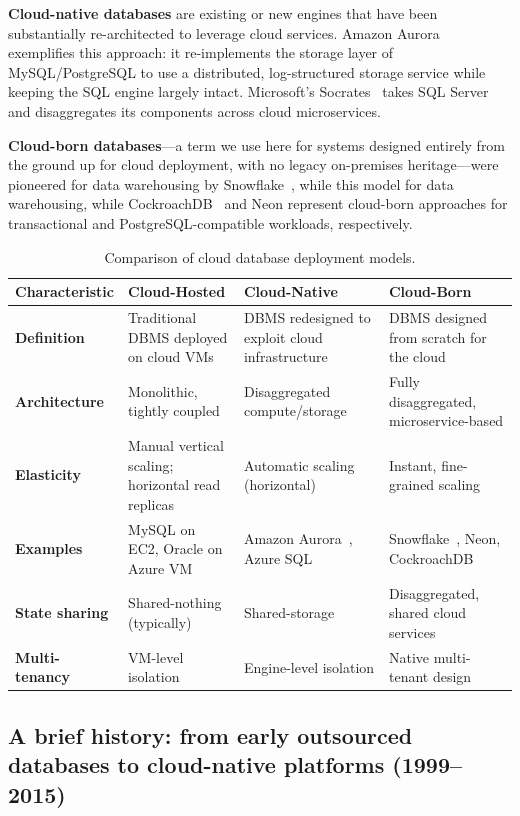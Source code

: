 \documentclass[a4paper,fleqn]{cas-sc}
\begin{document}
\textbf{Cloud-native databases} are existing or new engines that have been substantially re-architected to leverage cloud services. Amazon Aurora~\cite{Verbitski2017} exemplifies this approach: it re-implements the storage layer of MySQL/PostgreSQL to use a distributed, log-structured storage service while keeping the SQL engine largely intact. Microsoft's Socrates~\cite{Antonopoulos2019} takes SQL Server and disaggregates its components across cloud microservices.

\textbf{Cloud-born databases}---a term we use here for systems designed entirely from the ground up for cloud deployment, with no legacy on-premises heritage---were pioneered for data warehousing by Snowflake~\cite{Dageville2016}, while this model for data warehousing, while CockroachDB~\cite{Taft2020Cockroach} and Neon represent cloud-born approaches for transactional and PostgreSQL-compatible workloads, respectively.


\begin{table}[H]
\centering
\caption{Comparison of cloud database deployment models.}
\label{tab:cloudtypes}
\small
\begin{tabular}{p{2.5cm} p{3.5cm} p{3.5cm} p{3.5cm}}
\toprule
\textbf{Characteristic} & \textbf{Cloud-Hosted} & \textbf{Cloud-Native} & \textbf{Cloud-Born} \\
\midrule
\textbf{Definition} & Traditional DBMS deployed on cloud VMs & DBMS redesigned to exploit cloud infrastructure & DBMS designed from scratch for the cloud \\
\textbf{Architecture} & Monolithic, tightly coupled & Disaggregated compute/storage & Fully disaggregated, microservice-based \\
\textbf{Elasticity} & Manual vertical scaling; horizontal read replicas & Automatic scaling (horizontal) & Instant, fine-grained scaling \\
\textbf{Examples} & MySQL on EC2, Oracle on Azure VM & Amazon Aurora~\cite{Verbitski2017}, Azure SQL~\cite{Antonopoulos2019} & Snowflake~\cite{Dageville2016}, Neon, CockroachDB~\cite{Taft2020Cockroach} \\
\textbf{State sharing} & Shared-nothing (typically) & Shared-storage & Disaggregated, shared cloud services \\
\textbf{Multi-tenancy} & VM-level isolation & Engine-level isolation & Native multi-tenant design \\
\bottomrule
\end{tabular}
\end{table}
\subsection{A brief history: from early outsourced databases to cloud-native platforms (1999--2015)}
\label{subsec:history}
\end{document}
